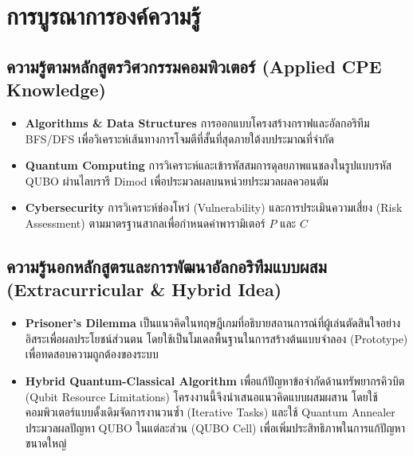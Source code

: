 \section{การบูรณาการองค์ความรู้}

\subsection{ความรู้ตามหลักสูตรวิศวกรรมคอมพิวเตอร์ (Applied CPE Knowledge)}
\begin{itemize}
    \item \textbf{Algorithms \& Data Structures} การออกแบบโครงสร้างกราฟและอัลกอริทึม BFS/DFS เพื่อวิเคราะห์เส้นทางการโจมตีที่สั้นที่สุดภายใต้งบประมาณที่จำกัด
    \item \textbf{Quantum Computing} การวิเคราะห์และเข้ารหัสสมการดุลยภาพแนชลงในรูปแบบรหัส QUBO ผ่านไลบรารี Dimod เพื่อประมวลผลบนหน่วยประมวลผลควอนตัม
    \item \textbf{Cybersecurity} การวิเคราะห์ช่องโหว่ (Vulnerability) และการประเมินความเสี่ยง (Risk Assessment) ตามมาตรฐานสากลเพื่อกำหนดค่าพารามิเตอร์ $P$ และ $C$
\end{itemize}

\subsection{ความรู้นอกหลักสูตรและการพัฒนาอัลกอริทึมแบบผสม (Extracurricular \& Hybrid Idea)}
\begin{itemize}
    \item \textbf{Prisoner's Dilemma} เป็นแนวคิดในทฤษฎีเกมที่อธิบายสถานการณ์ที่ผู้เล่นตัดสินใจอย่างอิสระเพื่อผลประโยชน์ส่วนตน \cite{prisoners,playprisoner} โดยใช้เป็นโมเดลพื้นฐานในการสร้างต้นแบบจำลอง (Prototype) เพื่อทดสอบความถูกต้องของระบบ
    \item \textbf{Hybrid Quantum-Classical Algorithm} เพื่อแก้ปัญหาข้อจำกัดด้านทรัพยากรคิวบิต (Qubit Resource Limitations) โครงงานนี้จึงนำเสนอแนวคิดแบบผสมผสาน \cite{hybrid} โดยใช้คอมพิวเตอร์แบบดั้งเดิมจัดการงานวนซ้ำ (Iterative Tasks) และใช้ Quantum Annealer ประมวลผลปัญหา QUBO ในแต่ละส่วน (QUBO Cell) เพื่อเพิ่มประสิทธิภาพในการแก้ปัญหาขนาดใหญ่
\end{itemize}